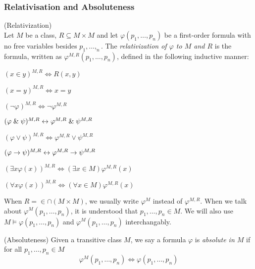\subsubsection{Relativisation and Absoluteness}
\begin{definition}{(Relativization)}\label{def:relativization}\\
Let $M$ be a class, $R \subseteq M\times M$ and let $\varphi(p_1, \ldots, p_n)$ be a first-order formula with no free variables besides $p_1, \ldots, _n$. 
The \emph{relativization of $\varphi$ to $M$ and $R$} is the formula, written as $\varphi^{M, R}(p_1, \ldots, p_n)$, defined in the following inductive manner:
\bce[(i)]
\item $(x \in y)^{M,R} \iff R(x, y)$
\item $(x = y)^{M,R} \iff x = y$
\item $(\neg \varphi)^{M,R} \iff \neg \varphi^{M,R}$
\item $(\varphi \mathrel{\&} \psi)^{M,R} \leftrightarrow \varphi^{M,R} \mathrel{\&} \psi^{M,R}$
\item $(\varphi \lor \psi)^{M,R} \iff \varphi^{M,R} \lor \psi^{M,R}$
\item $(\varphi \rightarrow \psi)^{M,R} \leftrightarrow \varphi^{M,R} \rightarrow \psi^{M,R}$
\item $(\exists x \varphi(x))^{M,R} \iff (\exists x \in M) \varphi^{M,R}(x)$
\item $(\forall x \varphi(x))^{M,R} \iff (\forall x \in M) \varphi^{M,R}(x)$
\ece
\end{definition}
When $R=\in\cap(M \times M)$, we usually write $\varphi^M$ instead of $\varphi^{M, R}$. When we talk about $\varphi^M(p_1, \ldots, p_n)$, it is understood that $p_1, \ldots, p_n \in M$.
We will also use $M \models \varphi(p_1, \ldots, p_n)$ and $\varphi^M(p_1, \ldots, p_n)$ interchangably.

\begin{definition}{(Absoluteness)}
Given a transitive class $M$, we say a formula $\varphi$ is \emph{absolute in $M$} if for all $p_1, \ldots, p_n \in M$
\begin{equation}
\varphi^M(p_1, \ldots, p_n) \iff \varphi(p_1, \ldots, p_n)
\end{equation}
\end{definition}

